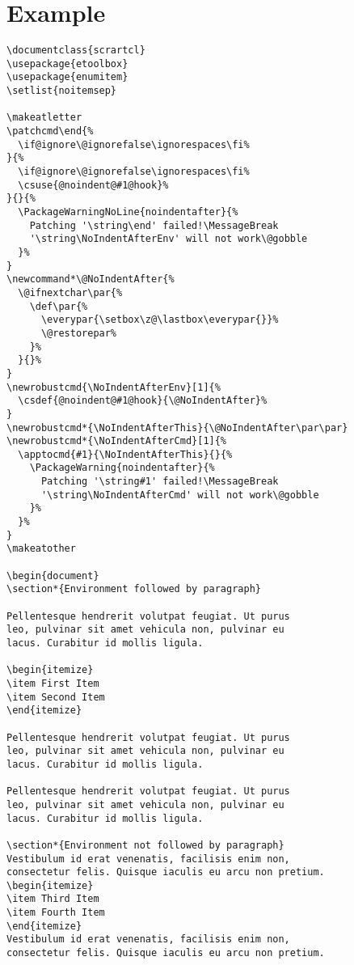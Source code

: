 \documentclass{scrartcl}
\begin{document}
\clearpage
\section*{Example}
\begin{verbatim}
\documentclass{scrartcl}
\usepackage{etoolbox}
\usepackage{enumitem}
\setlist{noitemsep}

\makeatletter
\patchcmd\end{%
  \if@ignore\@ignorefalse\ignorespaces\fi%
}{%
  \if@ignore\@ignorefalse\ignorespaces\fi%
  \csuse{@noindent@#1@hook}%
}{}{%
  \PackageWarningNoLine{noindentafter}{%
    Patching '\string\end' failed!\MessageBreak
    '\string\NoIndentAfterEnv' will not work\@gobble
  }%
}
\newcommand*\@NoIndentAfter{%
  \@ifnextchar\par{%
    \def\par{%
      \everypar{\setbox\z@\lastbox\everypar{}}%
      \@restorepar%
    }%
  }{}%
}
\newrobustcmd{\NoIndentAfterEnv}[1]{%
  \csdef{@noindent@#1@hook}{\@NoIndentAfter}%
}
\newrobustcmd*{\NoIndentAfterThis}{\@NoIndentAfter\par\par}
\newrobustcmd*{\NoIndentAfterCmd}[1]{%
  \apptocmd{#1}{\NoIndentAfterThis}{}{%
    \PackageWarning{noindentafter}{%
      Patching '\string#1' failed!\MessageBreak
      '\string\NoIndentAfterCmd' will not work\@gobble
    }%
  }%
}
\makeatother

\begin{document}
\section*{Environment followed by paragraph}

Pellentesque hendrerit volutpat feugiat. Ut purus
leo, pulvinar sit amet vehicula non, pulvinar eu
lacus. Curabitur id mollis ligula.

\begin{itemize}
\item First Item
\item Second Item
\end{itemize}

Pellentesque hendrerit volutpat feugiat. Ut purus
leo, pulvinar sit amet vehicula non, pulvinar eu
lacus. Curabitur id mollis ligula.

Pellentesque hendrerit volutpat feugiat. Ut purus
leo, pulvinar sit amet vehicula non, pulvinar eu
lacus. Curabitur id mollis ligula.

\section*{Environment not followed by paragraph}
Vestibulum id erat venenatis, facilisis enim non,
consectetur felis. Quisque iaculis eu arcu non pretium.
\begin{itemize}
\item Third Item
\item Fourth Item
\end{itemize}
Vestibulum id erat venenatis, facilisis enim non,
consectetur felis. Quisque iaculis eu arcu non pretium.


\end{verbatim}
\end{document}
